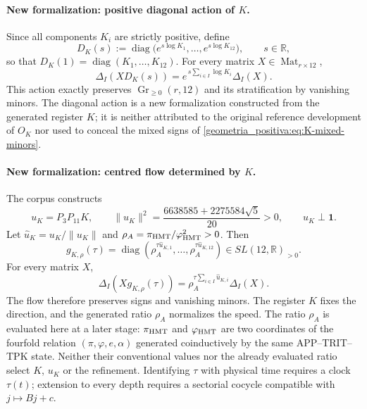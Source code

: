 \paragraph{New formalization: positive diagonal action of \(K\).}
Since all components \(K_i\) are strictly positive, define
\begin{equation}
 D_K(s):=\operatorname{diag}
 \bigl(e^{s\log K_1},\ldots,e^{s\log K_{12}}\bigr),
 \qquad s\in\mathbb R,
 \label{geometria_positiva:eq:K-positive-diagonal-flow}
\end{equation}
so that \(D_K(1)=\operatorname{diag}(K_1,\ldots,K_{12})\). For every matrix \(X\in\operatorname{Mat}_{r\times12}\),
\begin{equation}
 \Delta_I(XD_K(s))
 =e^{\,s\sum_{i\in I}\log K_i}\Delta_I(X).
 \label{geometria_positiva:eq:K-diagonal-minors}
\end{equation}
This action exactly preserves \(\operatorname{Gr}_{\ge0}(r,12)\) and its stratification by vanishing minors. The diagonal action is a new formalization constructed from the generated register \(K\); it is neither attributed to the original reference development of \(O_K\) nor used to conceal the mixed signs of \eqref{geometria_positiva:eq:K-mixed-minors}.

\paragraph{New formalization: centred flow determined by \(K\).}
The corpus constructs
\begin{equation}
 u_K=P_3P_{11}K,\qquad
 \|u_K\|^2=
 \frac{6638585+2275584\sqrt5}{20}>0,
 \qquad u_K\perp\mathbf1.
 \label{geometria_positiva:eq:K-centered-direction}
\end{equation}
Let \(\widehat u_K=u_K/\|u_K\|\) and \(\rho_A=\pi_{\rm HMT}/\varphi_{\rm HMT}^2>0\). Then
\begin{equation}
 g_{K,\rho}(\tau)=
 \operatorname{diag}\!\left(
 \rho_A^{\tau\widehat u_{K,1}},\ldots,
 \rho_A^{\tau\widehat u_{K,12}}\right)
 \in SL(12,\mathbb R)_{>0}.
 \label{geometria_positiva:eq:K-centered-positive-flow}
\end{equation}
For every matrix \(X\),
\begin{equation}
 \Delta_I(Xg_{K,\rho}(\tau))
 =\rho_A^{\tau\sum_{i\in I}\widehat u_{K,i}}\Delta_I(X).
 \label{geometria_positiva:eq:K-centered-flow-minors}
\end{equation}
The flow therefore preserves signs and vanishing minors. The register \(K\) fixes the direction, and the generated ratio \(\rho_A\) normalizes the speed. The ratio \(\rho_A\) is evaluated here at a later stage: \(\pi_{\rm HMT}\) and \(\varphi_{\rm HMT}\) are two coordinates of the fourfold relation \((\pi,\varphi,e,\alpha)\) generated coinductively by the same APP--TRIT--TPK state\@. Neither their conventional values nor the already evaluated ratio select \(K\), \(u_K\) or the refinement. Identifying \(\tau\) with physical time requires a clock \(\tau(t)\); extension to every depth requires a sectorial cocycle compatible with \(j\mapsto Bj+c\).

